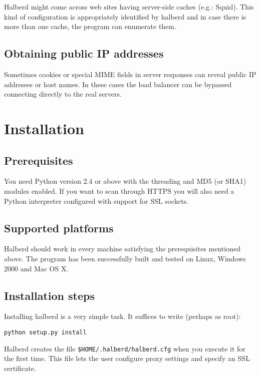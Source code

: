 \documentclass[a4paper]{book}
\begin{document}
Halberd might come across web sites having server-side caches (e.g.: Squid).
This kind of configuration is appropriately identified by halberd and in case
there is more than one cache, the program can enumerate them.

\section{Obtaining public IP addresses}

Sometimes cookies or special MIME fields in server responses can reveal public
IP addresses or host names. In these cases the load balancer can be bypassed
connecting directly to the real servers.

\chapter{Installation}

\section{Prerequisites}

You need Python version 2.4 or above with the threading and MD5 (or SHA1)
modules enabled.  If you want to scan through HTTPS you will also need a Python
interpreter configured with support for SSL sockets.

\section{Supported platforms}

Halberd should work in every machine satisfying the prerequisites mentioned
above.  The program has been successfully built and tested on Linux, Windows
2000 and Mac OS X.

\section{Installation steps}

Installing halberd is a very simple task.  It suffices to write (perhaps as
root):

\begin{verbatim}
python setup.py install
\end{verbatim}

Halberd creates the file \verb|$HOME/.halberd/halberd.cfg| when you execute it
for the first time.  This file lets the user configure proxy settings and
specify an SSL certificate.
\end{document}
